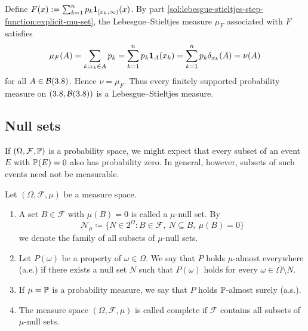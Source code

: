 \begin{solution}
\begin{enumerate}[label={\protect\hyperref[exitem:lebesgue-stieltjes-step-function:\arabic*]{(\alph*)}}]
\item \label{solitem:lebesgue-stieltjes-step-function:5}
Define
\(F(x) := \sum_{k=1}^n p_k\mathbf{1}_{[x_k,\infty)}(x)\).
By part \ref{sol:lebesgue-stieltjes-step-function:explicit-mu-set}, the Lebesgue--Stieltjes measure $\mu_F$ as\-so\-ciated with $F$ satisfies
\[
\mu_F(A)
=
\sum_{k : x_k\in A} p_k 
= 
\sum_{k=1}^n p_k \mathbf{1}_A(x_k)
=
\sum_{k=1}^n p_k \delta_{x_k}(A)
=
\nu(A)
\]
for all $A \in \mathcal{B}(3.8)$.
Hence $\nu = \mu_F$.
Thus every finitely supported probability measure on $(3.8,\mathcal{B}(3.8))$ is a Lebesgue--Stieltjes measure.
\qedhere
\end{enumerate}
\end{solution}
\pagebreak[3]





\subsection{Null sets}

If $(\Omega,\mathcal{F},\mathbb{P})$ is a probability space, we might expect that every subset of an event $E$ with $\mathbb{P}(E)=0$ also has probability zero.
In general, however, subsets of such events need not be measurable.

\begin{definition}\label{def:null-sets}
Let $(\Omega,\mathcal{F},\mu)$ be a measure space.
\begin{enumerate}[label=(\roman*)]
  \item 
  A set $B \in \mathcal{F}$ with $\mu(B)=0$ is called a $\mu$-null set.
  By 
  \[
  \mathcal{N}_\mu \coloneq \{N \in 2^\Omega : B \in \mathcal{F},\ N \subseteq B,\ \mu(B)=0\}
  \]
  we denote the family of all subsets of $\mu$-null sets.
  \item 
  Let $P(\omega)$ be a property of $\omega \in \Omega$.
  We say that $P$ holds $\mu$-almost everywhere (a.e.) if there exists a null set $N$ such that $P(\omega)$ holds for every $\omega \in \Omega \setminus N$.
  \item 
  If $\mu=\mathbb{P}$ is a probability measure, we say that $P$ holds $\mathbb{P}$-almost surely (a.s.).
  \item 
  The measure space $(\Omega,\mathcal{F},\mu)$ is called complete if $\mathcal{F}$ contains all subsets of $\mu$-null sets.
  \qedhere
\end{enumerate}
\end{definition}




